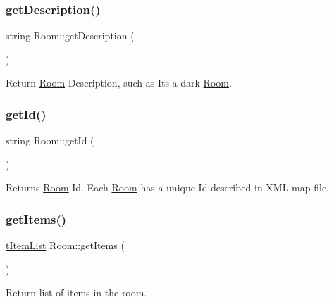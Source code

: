 \mbox{\label{class_room_a81fc1cb26425dfd00f45e7cb12fa5d88}} 
\subsubsection{\texorpdfstring{get\+Description()}{getDescription()}}
{\footnotesize\ttfamily string Room\+::get\+Description (\begin{DoxyParamCaption}{ }\end{DoxyParamCaption})}



Return \mbox{\hyperlink{class_room}{Room}} Description, such as \textquotesingle{}It\textquotesingle{}s a dark \mbox{\hyperlink{class_room}{Room}}\textquotesingle{}. 

\mbox{\label{class_room_a188ae0c43f994ea4a5a1f86a308623a7}} 
\subsubsection{\texorpdfstring{get\+Id()}{getId()}}
{\footnotesize\ttfamily string Room\+::get\+Id (\begin{DoxyParamCaption}{ }\end{DoxyParamCaption})}



Returns \mbox{\hyperlink{class_room}{Room}} Id. Each \mbox{\hyperlink{class_room}{Room}} has a unique Id described in X\+ML map file. 

\mbox{\label{class_room_a0a6d6e48cb9f69f250b5b59c3f2ddc54}} 
\subsubsection{\texorpdfstring{get\+Items()}{getItems()}}
{\footnotesize\ttfamily \mbox{\hyperlink{_room_8h_a2b991bc4061fac67565cc6be66a568ac}{t\+Item\+List}} Room\+::get\+Items (\begin{DoxyParamCaption}{ }\end{DoxyParamCaption})}



Return list of items in the room. 

